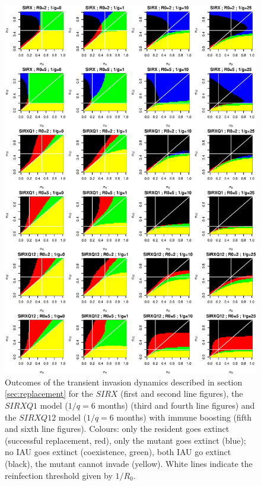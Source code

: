 \begin{figure}[!htbp]
  \center
  \includegraphics[width=0.8\linewidth]{texte/article3/graph/sens.eps}
  \caption{Outcomes of the transient invasion dynamics described in section \ref{sec:replacement} for the $SIRX$ (first and second line figures), the
    $SIRXQ1$ model ($1/q=6$ months) (third and fourth line figures) and the
    $SIRXQ12$ model ($1/q=6$ months) with immune boosting (fifth and
    sixth line figures). Colours: only the resident goes
    extinct (successful replacement, red), only the mutant goes
    extinct (blue); no IAU goes extinct (coexistence, green), both
    IAU go extinct (black), the
    mutant cannot invade (yellow). White lines indicate the reinfection
    threshold given by $1/R_{0}$.}
  \label{fig:sirx_area}
\end{figure}

